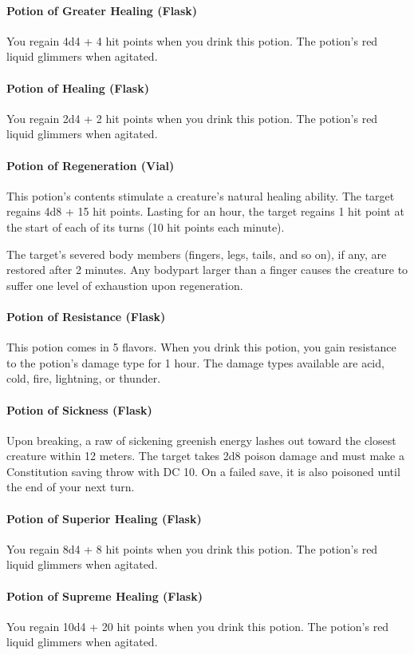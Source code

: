 \paragraph{Potion of Greater Healing (Flask)}
    You regain 4d4 + 4 hit points when you drink this potion.
    The potion's red liquid glimmers when agitated.
\paragraph{Potion of Healing (Flask)}
    You regain 2d4 + 2 hit points when you drink this potion.
    The potion's red liquid glimmers when agitated.
\paragraph{Potion of Regeneration (Vial)} %
    This potion's contents stimulate a creature's natural healing ability.
    The target regains 4d8 + 15 hit points.
    Lasting for an hour, the target regains 1 hit point at the start of each of its turns (10 hit points each minute).

    The target's severed body members (fingers, legs, tails, and so on), if any, are restored after 2 minutes.
    Any bodypart larger than a finger causes the creature to suffer one level of exhaustion upon regeneration.
\paragraph{Potion of Resistance (Flask)}
    This potion comes in 5 flavors.
    When you drink this potion, you gain resistance to the potion's damage type for 1 hour.
    The damage types available are acid, cold, fire, lightning, or thunder.
\paragraph{Potion of Sickness (Flask)} %
    Upon breaking, a raw of sickening greenish energy lashes out toward the closest creature within 12 meters.
    The target takes 2d8 poison damage and must make a Constitution saving throw with DC 10.
    On a failed save, it is also poisoned until the end of your next turn.
\paragraph{Potion of Superior Healing (Flask)}
    You regain 8d4 + 8 hit points when you drink this potion. The potion's red liquid glimmers when agitated.
\paragraph{Potion of Supreme Healing (Flask)}
    You regain 10d4 + 20 hit points when you drink this potion.
    The potion's red liquid glimmers when agitated.

